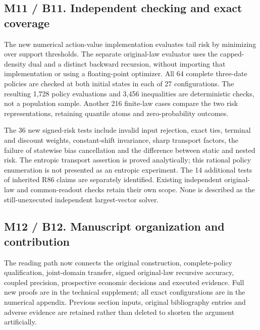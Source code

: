 \hypertarget{m11-b11.-independent-checking-and-exact-coverage}{%
\subsection{M11 / B11. Independent checking and exact
coverage}\label{m11-b11.-independent-checking-and-exact-coverage}}

The new numerical action-value implementation evaluates tail risk by
minimizing over support thresholds. The separate original-law evaluator
uses the capped-density dual and a distinct backward recursion, without
importing that implementation or using a floating-point optimizer. All
64 complete three-date policies are checked at both initial states in
each of 27 configurations. The resulting 1,728 policy evaluations and
3,456 inequalities are deterministic checks, not a population sample.
Another 216 finite-law cases compare the two risk representations,
retaining quantile atoms and zero-probability outcomes.

The 36 new signed-risk tests include invalid input rejection, exact
ties, terminal and discount weights, constant-shift invariance, sharp
transport factors, the failure of statewise bias cancellation and the
difference between static and nested risk. The entropic transport
assertion is proved analytically; this rational policy enumeration is
not presented as an entropic experiment. The 14 additional tests of
inherited R86 claims are separately identified. Existing independent
original-law and common-readout checks retain their own scope. None is
described as the still-unexecuted independent largest-vector solver.

\hypertarget{m12-b12.-manuscript-organization-and-contribution}{%
\subsection{M12 / B12. Manuscript organization and
contribution}\label{m12-b12.-manuscript-organization-and-contribution}}

The reading path now connects the original construction, complete-policy
qualification, joint-domain transfer, signed original-law recursive
accuracy, coupled precision, prospective economic decisions and executed
evidence. Full new proofs are in the technical supplement; all exact
configurations are in the numerical appendix. Previous section inputs,
original bibliography entries and adverse evidence are retained rather
than deleted to shorten the argument artificially.

